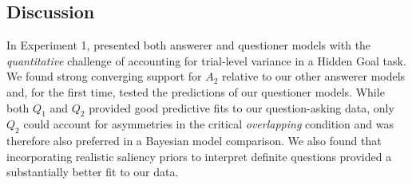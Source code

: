 \documentclass[12pt, floatsintext, jou]{apa6}
\begin{document}



\subsection{Discussion}

In Experiment 1, presented both answerer and questioner models with the  \emph{quantitative} challenge of accounting for trial-level variance in a Hidden Goal task. 
We found strong converging support for $A_2$ relative to our other answerer models and, for the first time, tested the predictions of our questioner models. 
While both $Q_1$ and $Q_2$ provided good predictive fits to our question-asking data, only $Q_2$ could account for asymmetries in the critical \emph{overlapping} condition and was therefore also preferred in a Bayesian model comparison. 
We also found that incorporating realistic saliency priors to interpret definite questions provided a substantially better fit to our data. 
\end{document}

